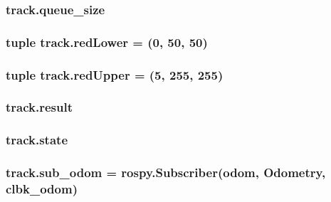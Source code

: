 \subsubsection[{\texorpdfstring{queue\+\_\+size}{queue_size}}]{\setlength{\rightskip}{0pt plus 5cm}track.\+queue\+\_\+size}\hypertarget{namespacetrack_a5a1cccbe6088028aaf5793b2c3f6e94a}{}\label{namespacetrack_a5a1cccbe6088028aaf5793b2c3f6e94a}
\subsubsection[{\texorpdfstring{red\+Lower}{redLower}}]{\setlength{\rightskip}{0pt plus 5cm}tuple track.\+red\+Lower = (0, 50, 50)}\hypertarget{namespacetrack_a760fae991a015aa4ee4c08fcaadeb576}{}\label{namespacetrack_a760fae991a015aa4ee4c08fcaadeb576}
\subsubsection[{\texorpdfstring{red\+Upper}{redUpper}}]{\setlength{\rightskip}{0pt plus 5cm}tuple track.\+red\+Upper = (5, 255, 255)}\hypertarget{namespacetrack_a1549403b0cb47b249afba9cdeca7ec16}{}\label{namespacetrack_a1549403b0cb47b249afba9cdeca7ec16}
\subsubsection[{\texorpdfstring{result}{result}}]{\setlength{\rightskip}{0pt plus 5cm}track.\+result}\hypertarget{namespacetrack_a029891d5b553b75642e169dde1d3fa2f}{}\label{namespacetrack_a029891d5b553b75642e169dde1d3fa2f}
\subsubsection[{\texorpdfstring{state}{state}}]{\setlength{\rightskip}{0pt plus 5cm}track.\+state}\hypertarget{namespacetrack_ad5613e9a1ce2fa3764d6bed0c696592b}{}\label{namespacetrack_ad5613e9a1ce2fa3764d6bed0c696592b}
\subsubsection[{\texorpdfstring{sub\+\_\+odom}{sub_odom}}]{\setlength{\rightskip}{0pt plus 5cm}track.\+sub\+\_\+odom = rospy.\+Subscriber(\textquotesingle{}odom\textquotesingle{}, Odometry, {\bf clbk\+\_\+odom})}\hypertarget{namespacetrack_af008e41d1a7c809d5ab05c44c21be95d}{}\label{namespacetrack_af008e41d1a7c809d5ab05c44c21be95d}

